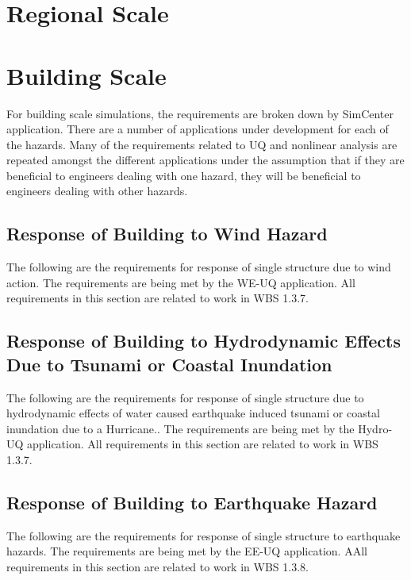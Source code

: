\documentclass{simcenterdocumentation}
\begin{document}
\section{Regional Scale}


\clearpage
\section{Building Scale}

For building scale simulations, the requirements are broken down by SimCenter application. There are a number of applications under development for each of the hazards. Many of the requirements related to UQ and nonlinear analysis are repeated amongst the different applications under the assumption that if they are beneficial to engineers dealing with one hazard, they will be beneficial to engineers dealing with other hazards.

\subsection{Response of Building to Wind Hazard}
The following are the requirements for response of single structure due to wind action. The requirements are being met by the WE-UQ application. All requirements in this section are related to work in WBS 1.3.7.

 
 
 \clearpage
 \subsection{Response of Building to Hydrodynamic Effects Due to Tsunami or Coastal Inundation}
The following are the requirements for response of single structure due to hydrodynamic effects of water caused earthquake induced tsunami or coastal inundation due to a Hurricane.. The requirements are being met by the Hydro-UQ application. All requirements in this section are related to work in WBS 1.3.7.

 
 
 \clearpage
\subsection{Response of Building to Earthquake Hazard}
The following are the requirements for response of single structure to earthquake hazards. The requirements are being met by the EE-UQ application. AAll requirements in this section are related to work in WBS 1.3.8.
\end{document}
